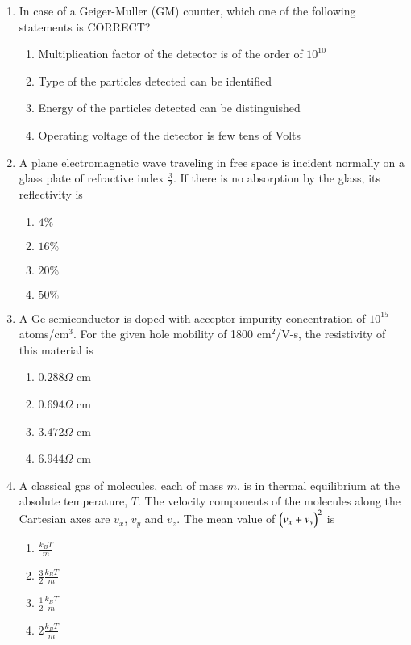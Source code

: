 \documentclass[journal]{IEEEtran}
\begin{document}
\begin{enumerate}
\item In case of a Geiger-Muller (GM) counter, which one of the following statements is CORRECT?
\begin{multicols}{2}
    \begin{enumerate}
        \item Multiplication factor of the detector is of the order of $10^{10}$
        \item Type of the particles detected can be identified
        \item Energy of the particles detected can be distinguished
        \item Operating voltage of the detector is few tens of Volts
    \end{enumerate}
\end{multicols}

\item A plane electromagnetic wave traveling in free space is incident normally on a glass plate of
refractive index $\frac{3}{2}$. If there is no absorption by the glass, its reflectivity is
\begin{multicols}{2}
    \begin{enumerate}
        \item $4 \%$
        \item $16 \%$
        \item $20 \%$
        \item $50 \%$
    \end{enumerate}
\end{multicols}

\item A Ge semiconductor is doped with acceptor impurity concentration of $10^{15}$ atoms/cm$^3$. For the given hole mobility of 1800 cm$^{2}$/V-s, the resistivity of this material is
\begin{multicols}{2}
    \begin{enumerate}
        \item $0.288 \Omega$ cm
        \item $0.694 \Omega$ cm
        \item $3.472 \Omega$ cm
        \item $6.944 \Omega$ cm
    \end{enumerate}
\end{multicols}

\item A classical gas of molecules, each of mass $m$, is in thermal equilibrium at the absolute temperature, $T$. The velocity components of the molecules along the Cartesian axes are $v_x$, $v_y$ and $v_z$. The mean value of $\left(v_x + v_y\right)^2$ is
\begin{multicols}{2}
    \begin{enumerate}
        \item $\frac{k_B T}{m}$
        \item $\frac{3}{2} \frac{k_B T}{m}$
        \item $\frac{1}{2} \frac{k_B T}{m}$
        \item $2\frac{k_B T}{m}$
    \end{enumerate}
\end{multicols}
\end{enumerate}
\end{document}
